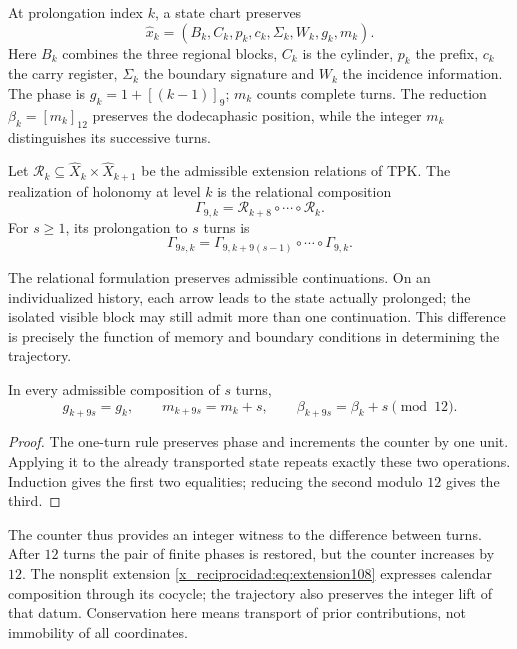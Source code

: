 At prolongation index \(k\), a state chart preserves
\[
 \widehat x_k=(B_k,C_k,p_k,c_k,\Sigma_k,W_k,g_k,m_k).
\]
Here \(B_k\) combines the three regional blocks, \(C_k\) is the cylinder,
\(p_k\) the prefix, \(c_k\) the carry register, \(\Sigma_k\) the boundary
signature and \(W_k\) the incidence information. The phase is
\(g_k=1+[(k-1)]_9\); \(m_k\) counts complete turns. The reduction
\(\beta_k=[m_k]_{12}\) preserves the dodecaphasic position, while the
integer \(m_k\) distinguishes its successive turns.

\begin{definition}
\label{x_reciprocidad:mono-ampl:def-vuelta}
Let \(\mathcal R_k\subseteq\widehat X_k\times\widehat X_{k+1}\)
be the admissible extension relations of TPK. The realization of
holonomy at level \(k\) is the relational composition
\[
 \Gamma_{9,k}=\mathcal R_{k+8}\circ\cdots\circ\mathcal R_k.
\]
For \(s\geq1\), its prolongation to \(s\) turns is
\[
 \Gamma_{9s,k}=
 \Gamma_{9,k+9(s-1)}\circ\cdots\circ\Gamma_{9,k}.
\]
\end{definition}

The relational formulation preserves admissible continuations. On
an individualized history, each arrow leads to the state actually
prolonged; the isolated visible block may still admit more than one
continuation. This difference is precisely the function of memory and
boundary conditions in determining the trajectory.

\begin{proposition}
\label{x_reciprocidad:mono-ampl:vueltas}
In every admissible composition of \(s\) turns,
\[
 g_{k+9s}=g_k,\qquad m_{k+9s}=m_k+s,\qquad
 \beta_{k+9s}=\beta_k+s\pmod{12}.
\]
\end{proposition}
\begin{proof}
The one-turn rule preserves phase and increments the counter by one
unit. Applying it to the already transported state repeats exactly these
two operations. Induction gives the first two equalities; reducing the
second modulo \(12\) gives the third.
\end{proof}

The counter thus provides an integer witness to the difference between
turns. After \(12\) turns the pair of finite phases is restored, but
the counter increases by \(12\). The nonsplit extension
\eqref{x_reciprocidad:eq:extension108} expresses calendar composition through its
cocycle; the trajectory also preserves the integer lift of that datum.
Conservation here means transport of prior contributions,
not immobility of all coordinates.

